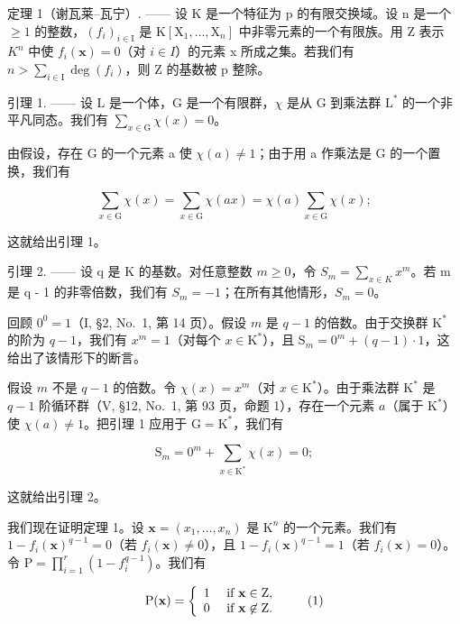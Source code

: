 定理 1（谢瓦莱–瓦宁）. —— 设 K 是一个特征为 p 的有限交换域。设 n 是一个 \(\geqslant 1\) 的整数，\((f_{i})_{i\in\mathrm{I}}\) 是 \(\mathrm{K}[\mathrm{X}_{1},\ldots,\mathrm{X}_{n}]\) 中非零元素的一个有限族。用 Z 表示 \(K^{n}\) 中使 \(f_{i}(\mathbf{x})=0\)（对 \(i\in I\)）的元素 x 所成之集。若我们有 \(n>\sum_{i\in\mathrm{I}}\deg(f_{i})\)，则 Z 的基数被 p 整除。

引理 1. —— 设 L 是一个体，G 是一个有限群，\(\chi\) 是从 G 到乘法群 \(\mathrm{L}^*\) 的一个非平凡同态。我们有 \(\sum_{x\in \mathrm{G}}\chi (x) = 0\)。

由假设，存在 G 的一个元素 a 使 \(\chi(a) \neq 1\)；由于用 a 作乘法是 G 的一个置换，我们有

\[
\sum_ {x \in \mathrm{G}} \chi (x) = \sum_ {x \in \mathrm{G}} \chi (a x) = \chi (a) \sum_ {x \in \mathrm{G}} \chi (x);
\]

这就给出引理 1。

引理 2. —— 设 q 是 K 的基数。对任意整数 \(m \geqslant 0\)，令 \(S_{m} = \sum_{x \in K} x^{m}\)。若 m 是 q - 1 的非零倍数，我们有 \(S_{m} = -1\)；在所有其他情形，\(S_{m} = 0\)。

回顾 \(0^0 = 1\)（I, §2, No.~1, 第 14 页）。假设 \(m\) 是 \(q - 1\) 的倍数。由于交换群 \(\mathrm{K}^*\) 的阶为 \(q - 1\)，我们有 \(x^m = 1\)（对每个 \(x \in \mathrm{K}^*\)），且 \(\mathrm{S}_m = 0^m + (q - 1) \cdot 1\)，这给出了该情形下的断言。

假设 \(m\) 不是 \(q - 1\) 的倍数。令 \(\chi(x) = x^m\)（对 \(x \in \mathrm{K}^*\)）。由于乘法群 \(\mathrm{K}^*\) 是 \(q - 1\) 阶循环群（V, §12, No.~1, 第 93 页，命题 1），存在一个元素 \(a\)（属于 \(\mathrm{K}^*\)）使 \(\chi(a) \neq 1\)。把引理 1 应用于 \(\mathrm{G} = \mathrm{K}^*\)，我们有

\[
\mathrm{S} _ {m} = 0 ^ {m} + \sum_ {x \in \mathrm{K} ^ {*}} \chi (x) = 0;
\]

这就给出引理 2。

我们现在证明定理 1。设 \(\mathbf{x} = (x_1, \ldots, x_n)\) 是 \(\mathrm{K}^n\) 的一个元素。我们有 \(1 - f_i(\mathbf{x})^{q-1} = 0\)（若 \(f_i(\mathbf{x}) \neq 0\)），且 \(1 - f_i(\mathbf{x})^{q-1} = 1\)（若 \(f_i(\mathbf{x}) = 0\)）。令 \(\mathrm{P} = \prod_{i=1}^{r}(1 - f_i^{q-1})\)。我们有

\[
\mathrm{P} (\mathbf {x}) = \left\{ \begin{array}{l l} 1 & \text { if } \mathbf {x} \in \mathrm{Z}, \\ 0 & \text { if } \mathbf {x} \not \in \mathrm{Z}. \end{array} \right.\tag{1}
\]

